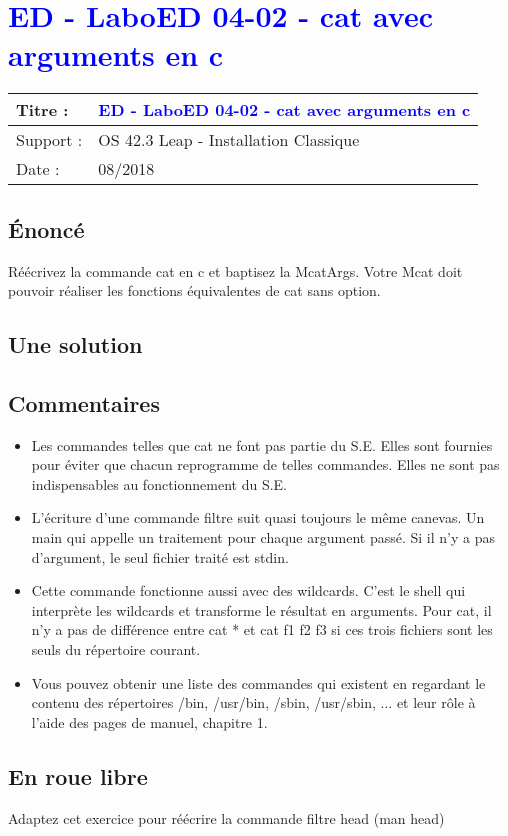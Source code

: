 \lstset{language=c}
\renewcommand{\titre}{\textcolor{blue}{ ED - LaboED 04-02 - cat avec arguments en c }}

\lhead{ \titre }
\section{{\titre} }

\begin{tabular}{|l|l|}
\hline
Titre : 	& \titre \\\hline
Support : 	& OS 42.3 Leap - Installation Classique \\\hline
Date :		& 08/2018 \\\hline
\end{tabular}

\subsection{Énoncé}

Réécrivez la commande cat en c et baptisez la McatArgs. Votre Mcat doit pouvoir réaliser les fonctions équivalentes de cat sans option.

\subsection{Une solution}



\subsection{Commentaires}

\begin{itemize}
\item Les commandes telles que cat ne font pas partie du S.E. Elles sont fournies pour éviter que chacun reprogramme de telles commandes. Elles ne sont pas indispensables au fonctionnement du S.E.
\item L'écriture d'une commande filtre suit quasi toujours le même canevas. Un main qui appelle un traitement pour chaque argument passé. Si il n'y a pas d'argument, le seul fichier traité est stdin.
\item Cette commande fonctionne aussi avec des wildcards. C'est le shell qui interprète les wildcards et transforme le résultat en arguments. Pour cat, il n'y a pas de différence entre cat * et cat f1 f2 f3 si ces trois fichiers sont les seuls du répertoire courant.
\item Vous pouvez obtenir une liste des commandes qui existent en regardant le contenu des répertoires /bin, /usr/bin, /sbin, /usr/sbin, ... et leur rôle à l'aide des pages de manuel, chapitre 1.
\end{itemize}

\subsection{En roue libre}
Adaptez cet exercice pour réécrire la commande filtre head (man head)

\newpage
